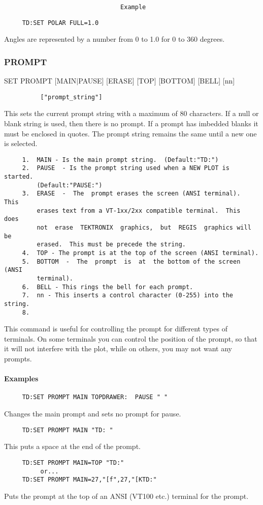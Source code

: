 \begin{verbatim}
                                Example
\end{verbatim}

\begin{verbatim}
     TD:SET POLAR FULL=1.0 
\end{verbatim}
Angles are represented by a number from 0 to 1.0 for 0 to 360 degrees. 
\subsubsection{PROMPT}
SET   PROMPT   [MAIN$|$PAUSE]   [ERASE]   [TOP]   [BOTTOM]   [BELL]  [nn]
\begin{verbatim}
          ["prompt_string"] 
\end{verbatim}

This  sets  the  current prompt string with a maximum of 80 characters.
If a null or blank string is used, then  there  is  no  prompt.   If  a
prompt  has  imbedded blanks it must be enclosed in quotes.  The prompt
string remains the same until a new one is selected.  
\begin{verbatim}
     1.  MAIN - Is the main prompt string.  (Default:"TD:") 
     2.  PAUSE  - Is the prompt string used when a NEW PLOT is started.
         (Default:"PAUSE:") 
     3.  ERASE  -  The  prompt erases the screen (ANSI terminal).  This
         erases text from a VT-1xx/2xx compatible terminal.  This  does
         not  erase  TEKTRONIX  graphics,  but  REGIS  graphics will be
         erased.  This must be precede the string.  
     4.  TOP - The prompt is at the top of the screen (ANSI terminal). 
     5.  BOTTOM  -  The  prompt  is  at  the bottom of the screen (ANSI
         terminal).  
     6.  BELL - This rings the bell for each prompt.  
     7.  nn - This inserts a control character (0-255) into the string. 
     8.  
\end{verbatim}

This  command  is useful for controlling the prompt for different types
of terminals.  On some terminals you can control the  position  of  the
prompt,  so  that it will not interfere with the plot, while on others,
you may not want any prompts.  
\paragraph{Examples}
\begin{verbatim}
     TD:SET PROMPT MAIN TOPDRAWER:  PAUSE " " 
\end{verbatim}
Changes the main prompt and sets no prompt for pause.  
\begin{verbatim}
     TD:SET PROMPT MAIN "TD: " 
\end{verbatim}
This puts a space at the end of the prompt.  
\begin{verbatim}
     TD:SET PROMPT MAIN=TOP "TD:" 
          or...  
     TD:SET PROMPT MAIN=27,"[f",27,"[KTD:" 
\end{verbatim}
Puts  the  prompt at the top of an ANSI (VT100 etc.) terminal for the
prompt.  
